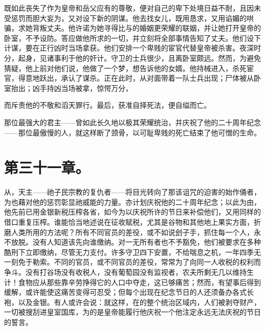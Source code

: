 既如此丧失了作为皇帝和岳父应有的尊敬，便对自己的卑下处境日益不耐，且因未受惩罚而胆大妄为，又对设下新的阴谋。他去找女儿，既用恳求，又用谄媚的哄骗，求她背叛丈夫。他许诺为她寻得比与的婚姻更荣耀的联姻，并让她打开皇帝的卧室，不予设防。答应做他所求的一切，并立刻将全部事情告知了丈夫。他们设下计谋，要在正行凶时当场拿获。他们安排一个卑贱的宦官代替皇帝被杀害。夜深时分，起身，见诸事利于他的奸计。守卫的士兵很少，且离卧室颇远。然而，为避免猜疑，他上前对他们说，他做了一个梦，想告诉他的女婿。他持械进入，杀死宦官，得意地跃出，承认了谋杀。正在此时，从对面带着一队士兵出现；尸体被从卧室抬出；凶手持凶当场被拿，惊愕万分，\par

\par

而斥责他的不敬和滔天罪行。最后，获准自择死法，便自缢而亡。\par

那位最强大的君主——曾如此长久地以极其荣耀统治，并庆祝了他的二十周年纪念——那位最傲慢的人，就这样断了颈骨，以可耻卑贱的死亡结束了他可憎的生命。\par


\section{第三十一章。}

从，天主——祂子民宗教的复仇者——将目光转向了那该诅咒的迫害的始作俑者，为也藉对他的惩罚彰显祂威能的力量。亦计划庆祝他的二十周年纪念；以此为由，他先前已用金银新税压榨各省，如今为以庆祝所许的节日来补偿他们，又用同样的借口重复压榨。谁能恰当地述说在征收赋税，尤其是谷物和其他地上果实方面，折磨人类所用的方法呢？所有不同官员的差役，或不如说刽子手，抓住每一个人，永不放脱。没有人知道该先向谁缴纳。对一无所有者也不予豁免，他们被要求在多种酷刑下立即缴纳，尽管无力支付。许多守卫四下安置，不给喘息之机，一年四季无一刻免于勒索。不同的官员，或不同官员的差役，常常为了向同一人收税的权利而争斗。没有打谷场没有收税人，没有葡萄园没有监视者，农夫所剩无几以维持生计！食物应从那些靠辛劳挣得它的人口中夺走，这已够痛苦；然而，有望事后得到缓解，或许能使这痛苦变得可忍受；但每个出现在纪念节日的人还须备办各式长袍，以及金银。有人或许会说：就这样，在的整个统治区域内，人们被剥夺财产，一切被搜刮进皇室国库，为的是皇帝能履行他庆祝一个他注定永远无法庆祝的节日的誓言。\par

